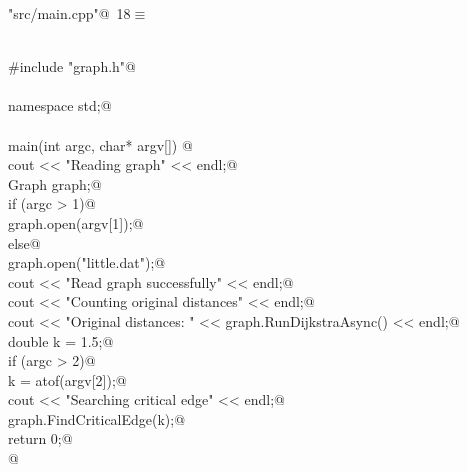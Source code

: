 \documentclass[12pt]{article}
\begin{document}
\begin{flushleft} \small
\begin{minipage}{\linewidth}\label{scrap22}\raggedright\small
{} \verb@"src/main.cpp"@\nobreak\ {\footnotesize {18}}$\equiv$
\vspace{-1ex}
\begin{list}{}{} \item
\mbox{}\verb@@\\
\mbox{}\verb@#include "graph.h"@\\
\mbox{}\verb@@\\
\mbox{}\verb@using namespace std;@\\
\mbox{}\verb@@\\
\mbox{}\verb@int main(int argc, char* argv[]) {@\\
\mbox{}\verb@    cout << "Reading graph" << endl;@\\
\mbox{}\verb@    Graph graph;@\\
\mbox{}\verb@    if (argc > 1)@\\
\mbox{}\verb@        graph.open(argv[1]);@\\
\mbox{}\verb@    else@\\
\mbox{}\verb@        graph.open("little.dat");@\\
\mbox{}\verb@    cout << "Read graph successfully" << endl;@\\
\mbox{}\verb@    cout << "Counting original distances" << endl;@\\
\mbox{}\verb@    cout << "Original distances: " << graph.RunDijkstraAsync() << endl;@\\
\mbox{}\verb@    double k = 1.5;@\\
\mbox{}\verb@    if (argc > 2)@\\
\mbox{}\verb@        k = atof(argv[2]);@\\
\mbox{}\verb@    cout << "Searching critical edge" << endl;@\\
\mbox{}\verb@    graph.FindCriticalEdge(k);@\\
\mbox{}\verb@    return 0;@\\
\mbox{}\verb@}@\\
\mbox{}\verb@@{\NWsep}
\end{list}
\vspace{-1.5ex}
\footnotesize
\begin{list}{}{\setlength{\itemsep}{-\parsep}\setlength{\itemindent}{-\leftmargin}}

\item{}
\end{list}
\end{minipage}\vspace{4ex}
\end{flushleft}
\end{document}
